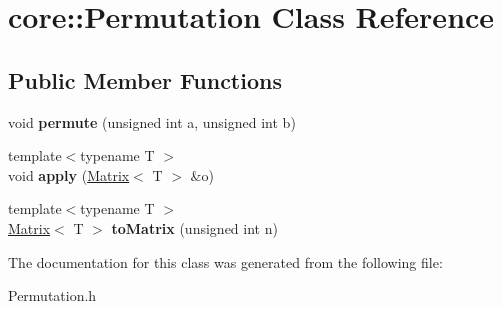 \hypertarget{classcore_1_1_permutation}{}\section{core\+:\+:Permutation Class Reference}
\label{classcore_1_1_permutation}
\subsection*{Public Member Functions}
\begin{DoxyCompactItemize}
\item 
\mbox{\label{classcore_1_1_permutation_a16d0c102fcfd4ac15c55dfb2ffa260b9}} 
void {\bfseries permute} (unsigned int a, unsigned int b)
\item 
\mbox{\label{classcore_1_1_permutation_aa88b0127e4d92aa87c20dea0d1ce07f2}} 
{\footnotesize template$<$typename T $>$ }\\void {\bfseries apply} (\mbox{\hyperlink{classcore_1_1_matrix}{Matrix}}$<$ T $>$ \&o)
\item 
\mbox{\label{classcore_1_1_permutation_ab940ccd7ddd43ecd190a666695b6635e}} 
{\footnotesize template$<$typename T $>$ }\\\mbox{\hyperlink{classcore_1_1_matrix}{Matrix}}$<$ T $>$ {\bfseries to\+Matrix} (unsigned int n)
\end{DoxyCompactItemize}


The documentation for this class was generated from the following file\+:\begin{DoxyCompactItemize}
\item 
Permutation.\+h\end{DoxyCompactItemize}
